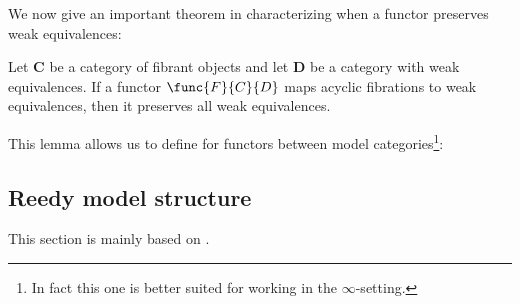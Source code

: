     We now give an important theorem in characterizing when a functor preserves weak equivalences:
    \begin{theorem}\label{model:ken_brown}
        Let $\mathbf{C}$ be a category of fibrant objects and let $\mathbf{D}$ be a category with weak equivalences. If a functor $\func{F}{C}{D}$ maps acyclic fibrations to weak equivalences, then it preserves all weak equivalences.
    \end{theorem}

    This lemma allows us to define  for functors between model categories\footnote{In fact this one is better suited for working in the $\infty$-setting.}:

\subsection{Reedy model structure}

    This section is mainly based on \cite{riehl_verity_reedy}.

